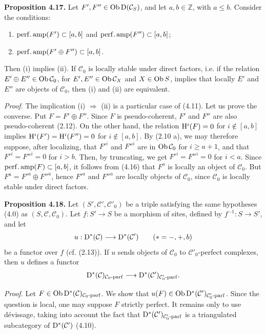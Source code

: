 \documentclass[11pt]{article}
\begin{document}
\textbf{Proposition 4.17.} Let \(F',F''\in\operatorname{Ob}\mathrm D(\mathcal C_S)\), and let \(a,b\in\mathbb Z\), with \(a\leq b\). Consider the conditions:
\begin{enumerate}[label=(\roman*)]
\item \(\operatorname{perf.amp}(F')\subset[a,b]\) and \(\operatorname{perf.amp}(F'')\subset[a,b]\);
\item \(\operatorname{perf.amp}(F'\oplus F'')\subset[a,b]\).
\end{enumerate}
Then (i) implies (ii). If \(\mathcal C_0\) is locally stable under direct factors, i.e. if the relation \(E'\oplus E''\in\operatorname{Ob}\mathcal C_0\), for \(E',E''\in\operatorname{Ob}\mathcal C_X\) and \(X\in\operatorname{Ob} S\), implies that locally \(E'\) and \(E''\) are objects of \(\mathcal C_0\), then (i) and (ii) are equivalent.

\emph{Proof.} The implication (i) \(\Rightarrow\) (ii) is a particular case of (4.11). Let us prove the converse. Put \(F=F'\oplus F''\). Since \(F\) is pseudo-coherent, \(F'\) and \(F''\) are also pseudo-coherent (2.12). On the other hand, the relation \(\mathrm H^i(F)=0\) for \(i\notin[a,b]\) implies \(\mathrm H^i(F')=\mathrm H^i(F'')=0\) for \(i\notin[a,b]\). By (2.10 a), we may therefore suppose, after localizing, that \(F'^i\) and \(F''^i\) are in \(\operatorname{Ob}\mathcal C_0\) for \(i\geq a+1\), and that \(F'^i=F''^i=0\) for \(i>b\). Then, by truncating, we get \(F'^i=F''^i=0\) for \(i<a\). Since \(\operatorname{perf.amp}(F)\subset[a,b]\), it follows from (4.16) that \(F^a\) is locally an object of \(\mathcal C_0\). But \(F^a=F'^a\oplus F''^a\), hence \(F'^a\) and \(F''^a\) are locally objects of \(\mathcal C_0\), since \(\mathcal C_0\) is locally stable under direct factors.

\textbf{Proposition 4.18.} Let \((S',\mathcal C',\mathcal C'_0)\) be a triple satisfying the same hypotheses (4.0) as \((S,\mathcal C,\mathcal C_0)\). Let \(f:S'\to S\) be a morphism of sites, defined by \(f^{-1}:S\to S'\), and let
\[
  u:\mathrm D^*(\mathcal C)\longrightarrow \mathrm D^*(\mathcal C')\qquad (*=-,+,b)
\]
be a functor over \(f\) (cf. (2.13)). If \(u\) sends objects of \(\mathcal C_0\) to \(\mathcal C'_0\)-perfect complexes, then \(u\) defines a functor
\[
  \mathrm D^*(\mathcal C)_{\mathcal C_0\text{-}\mathrm{parf}}
  \longrightarrow
  \mathrm D^*(\mathcal C')_{\mathcal C'_0\text{-}\mathrm{parf}}.
\]

\emph{Proof.} Let \(F\in\operatorname{Ob}\mathrm D^*(\mathcal C)_{\mathcal C_0\text{-}\mathrm{parf}}\). We show that \(u(F)\in\operatorname{Ob}\mathrm D^*(\mathcal C')_{\mathcal C'_0\text{-}\mathrm{parf}}\). Since the question is local, one may suppose \(F\) strictly perfect. It remains only to use dévissage, taking into account the fact that \(\mathrm D^*(\mathcal C')_{\mathcal C'_0\text{-}\mathrm{parf}}\) is a triangulated subcategory of \(\mathrm D^*(\mathcal C')\) (4.10).
\end{document}
